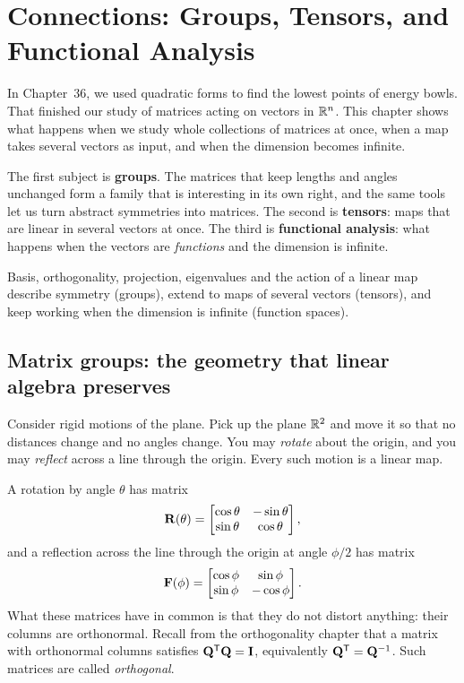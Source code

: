\chapter{Connections: Groups, Tensors, and Functional Analysis}

In Chapter~36, we used quadratic forms to find the lowest points of energy bowls.
That finished our study of matrices acting on vectors in $\mathbb{R}^n$. This chapter
shows what happens when we study whole collections of matrices at once, when a map takes several vectors as input,
and when the dimension becomes infinite.

The first subject is \textbf{groups}. The matrices that keep lengths and angles
unchanged form a family that is interesting in its own
right, and the same tools let us turn abstract symmetries into matrices. The second
is \textbf{tensors}: maps that are linear in several vectors at once. The third is \textbf{functional analysis}: what happens when
the vectors are \emph{functions} and the dimension is infinite.

\begin{focusbox}
Basis, orthogonality, projection,
eigenvalues and the action of a linear map describe symmetry (groups), extend to maps of several vectors (tensors),
and keep working when the dimension is infinite (function spaces).
\end{focusbox}

\section{Matrix groups: the geometry that linear algebra preserves}
\label{ch37:groups}

Consider rigid motions of the
plane. Pick up the plane $\mathbb{R}^2$ and move it so that no distances change and no
angles change. You may \emph{rotate} about the origin, and
you may \emph{reflect} across a line through the origin. Every such motion is a linear map.

A rotation by angle $\theta$ has matrix
\[
  \mathbf{R}(\theta)=\begin{bmatrix}\cos\theta & -\sin\theta\\ \sin\theta & \cos\theta\end{bmatrix},
\]
and a reflection across the line through the origin at angle $\phi/2$ has matrix
\[
  \mathbf{F}(\phi)=\begin{bmatrix}\cos\phi & \sin\phi\\ \sin\phi & -\cos\phi\end{bmatrix}.
\]
What these matrices have in common is that they do not distort anything:
their columns are orthonormal. Recall from the orthogonality chapter that a matrix
with orthonormal columns satisfies $\mathbf{Q}^{\mathsf{T}}\mathbf{Q}=\mathbf{I}$, equivalently
$\mathbf{Q}^{\mathsf{T}}=\mathbf{Q}^{-1}$. Such matrices are called \emph{orthogonal}.

